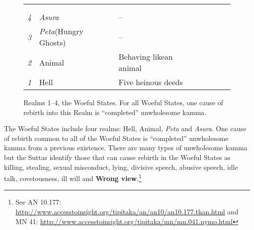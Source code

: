 \begin{figure}[H]
\centering
\renewcommand{\arraystretch}{1.1}
\setlength{\tabcolsep}{0mm}
\noindent\begin{tabular}{L{0.05\textwidth} C{0.2\textwidth} C{0.22\textwidth} C{0.15\textwidth} C{0.2\textwidth} C{0.09\textwidth} C{0.09\textwidth}}
\toprule
 & 
 & 
 & 
 & 
 & 
 \\
 & & & & &  & 
 \\
\midrule
\textit{4}
& \textit{Asura} & -- & 
& 
& 
& 
\\[6mm]
\textit{3} & \textit{Peta}\newline (Hungry Ghosts) & -- & & & &
\\[6mm]
\textit{2} & Animal & Behaving like\newline an animal & & & &
\\[6mm]
\textit{1} & Hell & Five heinous deeds & & & &
\\[6mm]
\bottomrule
\end{tabular}

\caption{Realms 1--4, the Woeful States. For all Woeful States, one cause of rebirth into this Realm is ``completed'' unwholesome kamma.}
\label{fig:Woeful1}
\end{figure}

The Woeful States include four realms: Hell, Animal, \textit{Peta} and \textit{Asura}. One cause of rebirth common to all of the Woeful States is “completed” unwholesome kamma from a previous existence. There are many types of unwholesome kamma but the Suttas identify those that can cause rebirth in the Woeful States as killing, stealing, sexual misconduct, lying, divisive speech, abusive speech, idle talk, covetousness, ill will and \textbf{Wrong view}.\footnote{See AN 10.177: \url{http://www.accesstoinsight.org/tipitaka/an/an10/an10.177.than.html} and MN 41: \url{http://www.accesstoinsight.org/tipitaka/mn/mn.041.nymo.html}}

